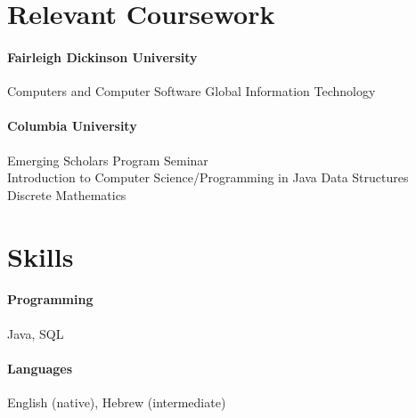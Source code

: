 \documentclass[10pt]{article}
\begin{document}
                                                            
\section*{Relevant Coursework}
    \paragraph*{Fairleigh Dickinson University}
    \hfill
    Computers and Computer Software
    \hfill
    Global Information Technology

    \paragraph*{Columbia University}
    \hfill
    Emerging Scholars Program Seminar
    \\
    Introduction to Computer Science/Programming in Java
    \hfill
    Data Structures
    \hfill
    Discrete Mathematics

                          
\section*{Skills}
    \paragraph*{Programming}
    Java, SQL
    \paragraph*{Languages}
    English (native), Hebrew (intermediate)

\end{document}
